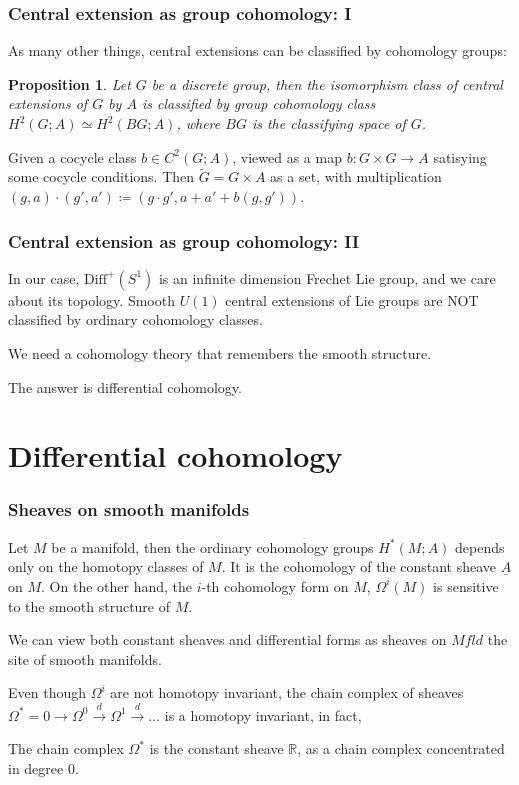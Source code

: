 \documentclass{beamer}
\newcommand{\Mfld}{Mfld}
\newcommand{\R}{\mathbb R}
\newcommand{\Diff}{\mathrm{Diff}^+(S^1)}
\newtheorem{prop}[equation]{Proposition}
\begin{document}
\begin{frame}
    \frametitle{Central extension as group cohomology: I}
    As many other things, central extensions can be classified by cohomology groups: \pause 
    
    \begin{prop}
        Let $G$ be a discrete group, then the isomorphism class of central extensions of $G$ by $A$ is 
        classified by group cohomology class $H^2(G; A) \simeq H^2(BG; A)$, where $BG$ is the 
        classifying space of $G$.
    \end{prop}

    Given a cocycle class $b \in C^2(G;A)$, viewed as a map $b : G \times G \to A$ 
    satisying some cocycle conditions. Then $\tilde{G} = G \times A$ as a set, with multiplication 
    $(g, a) \cdot (g', a') \coloneqq (g \cdot g', a + a' + b(g, g'))$.
\end{frame}

\begin{frame}
    \frametitle{Central extension as group cohomology: II}
    In our case, $\Diff$ is an infinite dimension Frechet Lie group, and we care about 
    its topology. Smooth $U(1)$ central extensions of Lie groups are \alert{NOT} classified 
    by ordinary cohomology classes.  \pause \vspace{5mm}

    We need a cohomology theory that remembers the smooth structure. \pause 

    \vspace{5mm} The answer is \alert{differential cohomology}.
\end{frame}


\section{Differential cohomology}

\begin{frame}
    \frametitle{Sheaves on smooth manifolds}
    Let $M$ be a manifold, then the ordinary cohomology groups  $H^*(M; A)$ depends 
    only on the homotopy classes of $M$. It is the cohomology of the constant sheave 
    $\underline{A}$ on $M$.
    On the other hand, the $i$-th cohomology form on $M$, $\Omega^i(M)$ is sensitive 
    to the smooth structure of $M$. \pause \vspace{5mm}
    
    We can view both constant sheaves and 
    differential forms as sheaves on $\Mfld$ the site of smooth manifolds. \pause 

    \vspace{5mm}
    Even though $\Omega^i$ are not homotopy invariant, the chain complex of sheaves 
    $\Omega^* = 0 \to \Omega^0 \xrightarrow{d} \Omega^1 \xrightarrow{d} \dots$ is a homotopy invariant,
    in fact,
    \begin{theorem}[de Rham]
        The chain complex $\Omega^*$ is the constant sheave $\R$, as a chain complex concentrated in degree 0.
    \end{theorem}
\end{frame}
\end{document}
